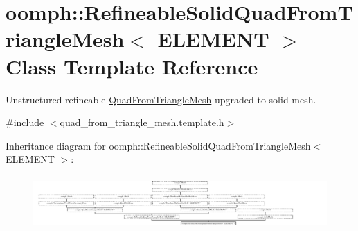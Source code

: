 \hypertarget{classoomph_1_1RefineableSolidQuadFromTriangleMesh}{}\section{oomph\+:\+:Refineable\+Solid\+Quad\+From\+Triangle\+Mesh$<$ E\+L\+E\+M\+E\+NT $>$ Class Template Reference}
\label{classoomph_1_1RefineableSolidQuadFromTriangleMesh}


Unstructured refineable \hyperlink{classoomph_1_1QuadFromTriangleMesh}{Quad\+From\+Triangle\+Mesh} upgraded to solid mesh.  




{\ttfamily \#include $<$quad\+\_\+from\+\_\+triangle\+\_\+mesh.\+template.\+h$>$}

Inheritance diagram for oomph\+:\+:Refineable\+Solid\+Quad\+From\+Triangle\+Mesh$<$ E\+L\+E\+M\+E\+NT $>$\+:\begin{figure}[H]
\begin{center}
\leavevmode
\includegraphics[height=2.118919cm]{classoomph_1_1RefineableSolidQuadFromTriangleMesh}
\end{center}
\end{figure}
